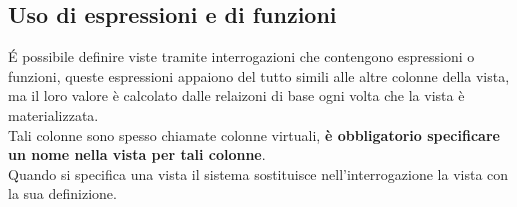 \subsection{Uso di espressioni e di funzioni}
\'E possibile definire viste tramite interrogazioni che contengono espressioni o funzioni,
queste espressioni appaiono del tutto simili alle altre colonne della vista, ma il loro
valore è calcolato dalle relaizoni di base ogni volta che la vista è materializzata.\\
Tali colonne sono spesso chiamate colonne virtuali, \textbf{è obbligatorio specificare un
nome nella vista per tali colonne}.\\
Quando si specifica una vista il sistema sostituisce nell'interrogazione la vista con la sua
definizione.
